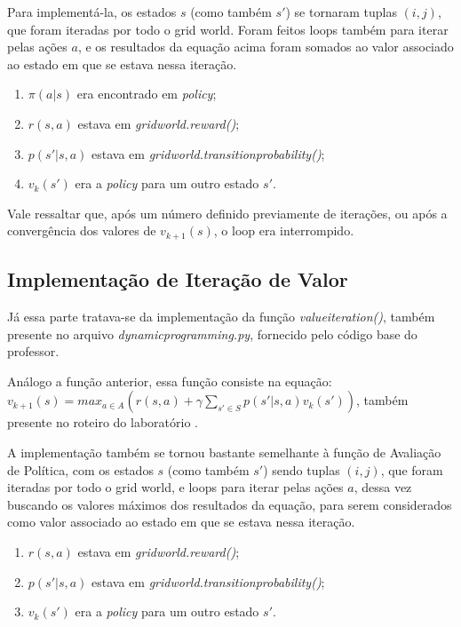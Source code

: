 \documentclass[conference]{IEEEtran}
\begin{document}
Para implementá-la, os estados $s$ (como também $s'$) se tornaram tuplas $(i, j)$, que foram iteradas por todo o grid world. Foram feitos loops também para iterar pelas ações $a$, e os resultados da equação acima foram somados ao valor associado ao estado em que se estava nessa iteração. 

\begin{enumerate}
\item $\pi \left ( a|s \right )$ era encontrado em \textit{policy};

\item $r \left ( s, a \right )$ estava em \textit{grid\underline{\space}world.reward()};

\item $p \left ( s' | s, a \right )$ estava em \textit{grid\underline{\space}world.transition\underline{\space}probability()};

\item $v_k \left ( s' \right )$ era a \textit{policy} para um outro estado $s'$.
\end{enumerate}

Vale ressaltar que, após um número definido previamente de iterações, ou após a convergência dos valores de $v_{k+1}(s)$, o loop era interrompido.

\subsection{Implementação de Iteração de Valor}
Já essa parte tratava-se da implementação da função \textit{value\underline{\space}iteration()}, também presente no arquivo \textit{dynamic\underline{\space}programming.py}, fornecido pelo código base do professor.

Análogo a função anterior, essa função consiste na equação: $v_{k+1}\left ( s \right ) = max_{a \in A} \left (  r \left ( s, a \right ) + \gamma \sum_{s'\in S} p \left ( s' | s, a \right ) v_k \left ( s' \right ) \right )$, também presente no roteiro do laboratório \cite{roteiro}.

A implementação também se tornou bastante semelhante à função de Avaliação de Política, com os estados $s$ (como também $s'$) sendo tuplas $(i, j)$, que foram iteradas por todo o grid world, e loops para iterar pelas ações $a$, dessa vez buscando os valores máximos dos resultados da equação, para serem considerados como valor associado ao estado em que se estava nessa iteração. 

\begin{enumerate}
\item $r \left ( s, a \right )$ estava em \textit{grid\underline{\space}world.reward()};

\item $p \left ( s' | s, a \right )$ estava em \textit{grid\underline{\space}world.transition\underline{\space}probability()};

\item $v_k \left ( s' \right )$ era a \textit{policy} para um outro estado $s'$.
\end{enumerate}
\end{document}
